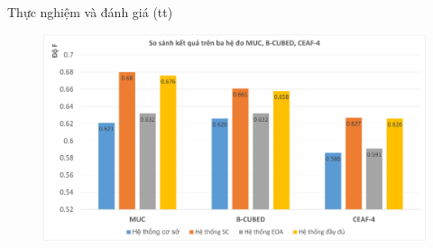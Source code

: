 \documentclass[9pt,xcolor=table,hyperref=unicode]{beamer}
\begin{document}
		\begin{frame}[t]{Thực nghiệm và đánh giá (tt)}								
					\begin{figure}[H] 			
						\centering					
						\includegraphics[scale=0.45]{charts/chart_comparison.pdf}									
					\end{figure} 				
		\end{frame}	
\end{document}

